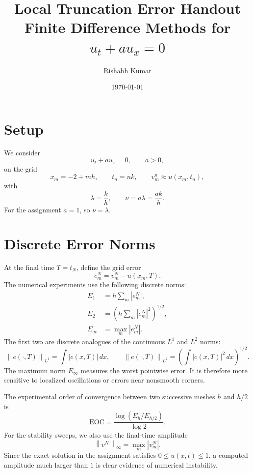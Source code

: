 \documentclass[11pt]{article}
\title{Local Truncation Error Handout\\
Finite Difference Methods for $u_t+a u_x=0$}
\author{Rishabh Kumar}
\date{\today}
\newcommand{\eoc}{\mathrm{EOC}}
\newcommand{\norm}[1]{\left\lVert #1\right\rVert}
\begin{document}
\maketitle

\section{Setup}

We consider
\begin{equation}
    u_t+a u_x=0,\qquad a>0,
\end{equation}
on the grid
\begin{equation}
    x_m=-2+mh,\qquad t_n=nk,\qquad
    v_m^n\approx u(x_m,t_n),
\end{equation}
with
\begin{equation}
    \lambda=\frac{k}{h},\qquad \nu=a\lambda=\frac{ak}{h}.
\end{equation}
For the assignment $a=1$, so $\nu=\lambda$.

\section{Discrete Error Norms}

At the final time $T=t_N$, define the grid error
\begin{equation}
    e_m^N=v_m^N-u(x_m,T).
\end{equation}
The numerical experiments use the following discrete norms:
\begin{align}
    E_1
    &=
    h\sum_m |e_m^N|,
    \\
    E_2
    &=
    \left(h\sum_m |e_m^N|^2\right)^{1/2},
    \\
    E_\infty
    &=
    \max_m |e_m^N|.
\end{align}
The first two are discrete analogues of the continuous $L^1$ and $L^2$ norms:
\begin{equation}
    \norm{e(\cdot,T)}_{L^1}
    =
    \int |e(x,T)|\,dx,
    \qquad
    \norm{e(\cdot,T)}_{L^2}
    =
    \left(\int |e(x,T)|^2\,dx\right)^{1/2}.
\end{equation}
The maximum norm $E_\infty$ measures the worst pointwise error.  It is therefore more
sensitive to localized oscillations or errors near nonsmooth corners.

The experimental order of convergence between two successive meshes $h$ and $h/2$ is
\begin{equation}
    \eoc
    =
    \frac{\log(E_h/E_{h/2})}{\log 2}.
\end{equation}
For the stability sweeps, we also use the final-time amplitude
\begin{equation}
    \norm{v^N}_\infty=\max_m |v_m^N|.
\end{equation}
Since the exact solution in the assignment satisfies $0\le u(x,t)\le1$, a computed
amplitude much larger than $1$ is clear evidence of numerical instability.
\end{document}
